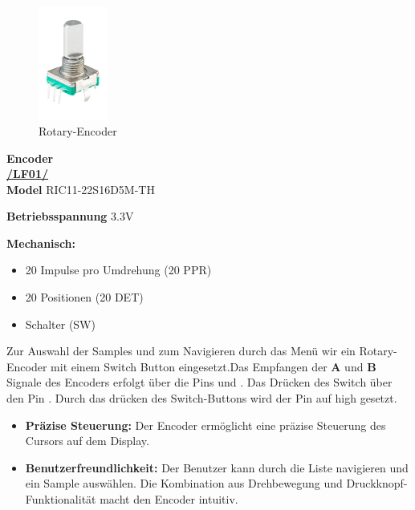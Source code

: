 


\begin{figure} %
	\vspace{-60pt + 0.02\textwidth}
	\hspace{0.07\textwidth} %
	\includegraphics[width=0.2\textwidth]{images/05_technische_spezifikation/Interface/Encoder.png} %
	\caption{Rotary-Encoder}
	\label{fig:rotary_encoder}
	\vspace{-100pt}
\end{figure}

\textbf{\hypertarget{Encoder}{Encoder}} \\

\textbf{\hyperlink{LF01_Link}{/LF01/}} \\

\textbf{Model} RIC11-22S16D5M-TH

\textbf{Betriebsspannung} 3.3V

\textbf{Mechanisch:}
\begin{itemize}
	\item 20 Impulse pro Umdrehung (20 PPR)
	\item 20 Positionen (20 DET)
	\item Schalter (SW)
\end{itemize} 



Zur Auswahl der Samples und zum Navigieren durch das Menü wir ein Rotary-Encoder mit einem Switch Button eingesetzt.Das Empfangen der \textbf{A} und \textbf{B} Signale des Encoders erfolgt über die Pins  und .
Das Drücken des Switch über den Pin . Durch das drücken des Switch-Buttons wird der Pin  auf high gesetzt.

\begin{itemize}
	\item \textbf{Präzise Steuerung:} Der Encoder ermöglicht eine präzise Steuerung des Cursors auf dem Display.
	
	\item \textbf{Benutzerfreundlichkeit:} Der Benutzer kann durch die Liste navigieren und ein Sample auswählen. Die Kombination aus Drehbewegung und Druckknopf-Funktionalität macht den Encoder intuitiv.  
\end{itemize}

